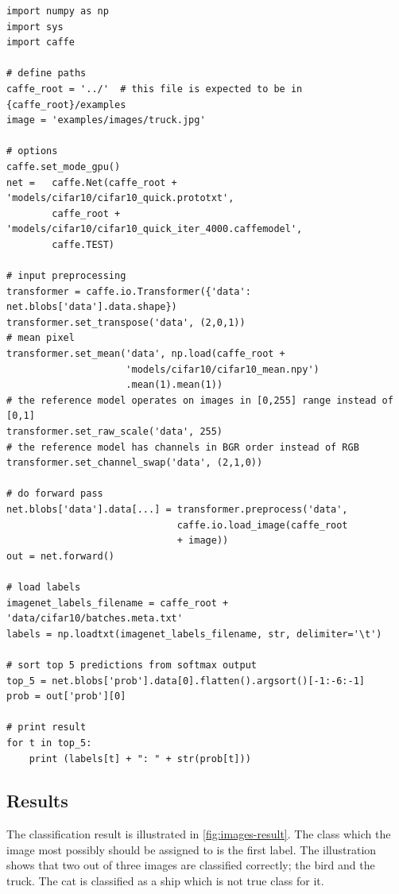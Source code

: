 \begin{lstlisting}[caption = The python script used for classification with the
caffemodel from the initial CNN., label={lst:script}] import numpy as np
import sys
import caffe

# define paths
caffe_root = '../'  # this file is expected to be in {caffe_root}/examples
image = 'examples/images/truck.jpg'

# options
caffe.set_mode_gpu()
net =	caffe.Net(caffe_root + 'models/cifar10/cifar10_quick.prototxt',
        caffe_root + 'models/cifar10/cifar10_quick_iter_4000.caffemodel',
        caffe.TEST)

# input preprocessing
transformer = caffe.io.Transformer({'data': net.blobs['data'].data.shape})
transformer.set_transpose('data', (2,0,1))
# mean pixel
transformer.set_mean('data', np.load(caffe_root + 
					 'models/cifar10/cifar10_mean.npy')
					 .mean(1).mean(1)) 
# the reference model operates on images in [0,255] range instead of [0,1]
transformer.set_raw_scale('data', 255)
# the reference model has channels in BGR order instead of RGB  
transformer.set_channel_swap('data', (2,1,0))  

# do forward pass
net.blobs['data'].data[...] = transformer.preprocess('data', 
							  caffe.io.load_image(caffe_root 
							  + image))
out = net.forward()

# load labels
imagenet_labels_filename = caffe_root + 'data/cifar10/batches.meta.txt'
labels = np.loadtxt(imagenet_labels_filename, str, delimiter='\t')

# sort top 5 predictions from softmax output
top_5 = net.blobs['prob'].data[0].flatten().argsort()[-1:-6:-1]
prob = out['prob'][0]

# print result
for t in top_5:
    print (labels[t] + ": " + str(prob[t]))
\end{lstlisting}

\subsection{Results} %
\label{sub:results}

The classification result is illustrated in \autoref{fig:images-result}. The
class which the image most possibly should be assigned to is the first label.
The illustration shows that two out of three images are classified correctly;
the bird and the truck. The cat is classified as a ship which is not true class for it.

